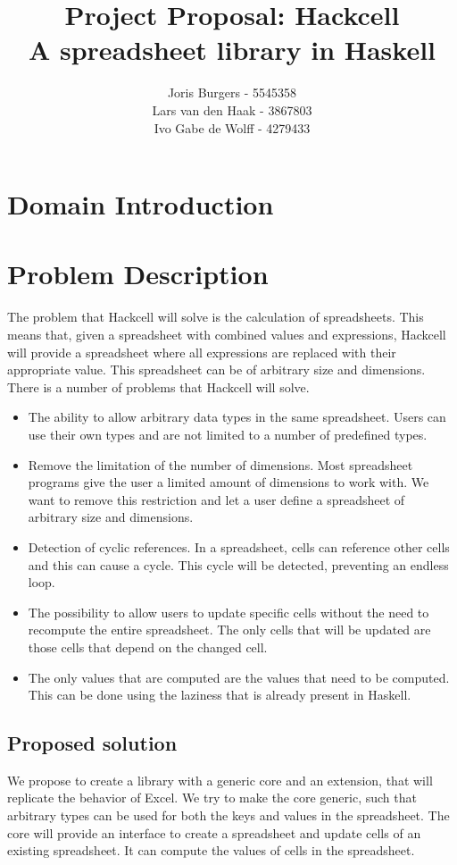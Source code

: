 \documentclass{article}
\title{
	\vskip -3cm
	Project Proposal: Hackcell \\
	\vskip 0.5cm
	\large{A spreadsheet library in Haskell}
}
\author{Joris Burgers - 5545358\\ Lars van den Haak - 3867803\\ Ivo Gabe de Wolff - 4279433}
\begin{document}
	\maketitle
	\section{Domain Introduction}
	
	\section{Problem Description}
	The problem that Hackcell will solve is the calculation of spreadsheets. This means that, given a spreadsheet with combined values and expressions, Hackcell will provide a spreadsheet where all expressions are replaced with their appropriate value. This spreadsheet can be of arbitrary size and dimensions. There is a number of problems that Hackcell will solve.
\begin{itemize}
	\item The ability to allow arbitrary data types in the same spreadsheet. Users can use their own types and are not limited to a number of predefined types. 
	\item Remove the limitation of the number of dimensions. Most spreadsheet programs give the user a limited amount of dimensions to work with. We want to remove this restriction and let a user define a spreadsheet of arbitrary size and dimensions.
	\item Detection of cyclic references. In a spreadsheet, cells can reference other cells and this can cause a cycle. This cycle will be detected, preventing an endless loop.
	\item The possibility to allow users to update specific cells without the need to recompute the entire spreadsheet. The only cells that will be updated are those cells that depend on the changed cell.
	\item The only values that are computed are the values that need to be computed. This can be done using the laziness that is already present in Haskell. 
\end{itemize}	
	
	\subsection{Proposed solution}
	We propose to create a library with a generic core and an extension, that will replicate the behavior of Excel. We try to make the core generic, such that arbitrary types can be used for both the keys and values in the spreadsheet. The core will provide an interface to create a spreadsheet and update cells of an existing spreadsheet. It can compute the values of cells in the spreadsheet.
	
\end{document}
